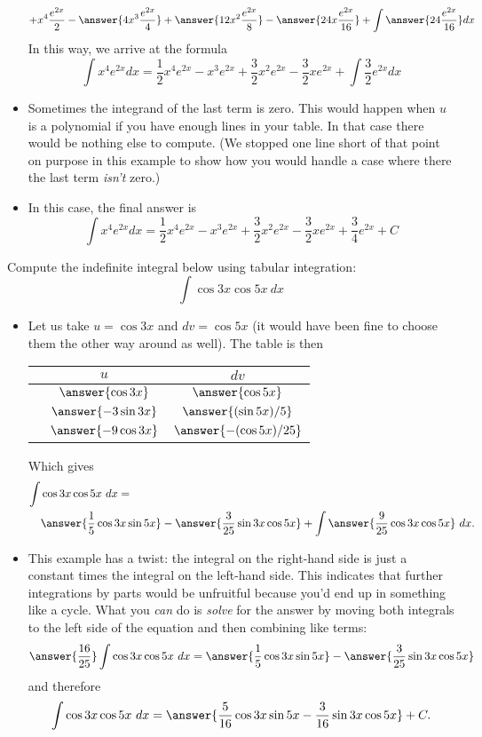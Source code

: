 \documentclass{ximera}
\begin{document}
\begin{example}
\begin{itemize}
\[ + x^4 \frac{e^{2x}}{2} - \answer{4 x^3 \frac{e^{2x}}{4}} + \answer{12 x^2 \frac{e^{2x}}{8}} - \answer{24 x\frac{e^{2x}}{16} }+ \int \answer{24 \frac{e^{2x}}{16}} dx \]
In this way, we arrive at the formula
\[ \int x^4 e^{2x} dx = \frac{1}{2} x^4 e^{2x} - x^3 e^{2x} + \frac{3}{2} x^2 e^{2x} - \frac{3}{2} x e^{2x} + \int \frac{3}{2} e^{2x} dx \]
\item Sometimes the integrand of the last term is zero. This would happen when $u$ is a polynomial if you have enough lines in your table. In that case there would be nothing else to compute.  (We stopped one line short of that point on purpose in this example to show how you would handle a case where there the last term \textit{isn't} zero.)
\item In this case, the final answer is
\[ \int x^4 e^{2x} dx = \frac{1}{2} x^4 e^{2x} - x^3 e^{2x} + \frac{3}{2} x^2 e^{2x} - \frac{3}{2} x e^{2x} + \frac{3}{4} e^{2x} +C \]
\end{itemize}
\end{example}


\begin{example}
Compute the indefinite integral below using tabular integration:
\[ \int \cos 3x \cos 5x ~dx \]
\begin{itemize}
\item Let us take $u = \cos 3x$ and $dv = \cos 5x$ (it would have been fine to choose them the other way around as well). The table is then
\begin{center}
\begin{tabular}{ccc}
& $u$ & $dv$ \\
\hline
& $\answer{\cos 3x}$ & $\answer{\cos 5x}$ \\
& $\answer{-3 \sin 3 x}$ & $\answer{(\sin 5x)/5}$ \\
& $\answer{-9 \cos 3x}$ & $\answer{-(\cos 5x)/25}$
\end{tabular}
\end{center}
Which gives
\[ \begin{aligned} \int & \cos 3x \cos 5x ~dx = \\ & \answer{ \frac{1}{5} \cos 3x \sin 5x} - \answer{\frac{3}{25} \sin 3x \cos 5x} + \int \answer{\frac{9}{25} \cos 3x \cos 5x} ~dx. \end{aligned} \]
\item This example has a twist: the integral on the right-hand side is just a constant times the integral on the left-hand side. This indicates that further integrations by parts would be unfruitful because you'd end up in something like a cycle.  What you \textit{can} do is \textit{solve} for the answer by moving both integrals to the left side of the equation and then combining like terms:
\[ \answer{\frac{16}{25}} \int  \cos 3x \cos 5x ~dx =  \answer{ \frac{1}{5} \cos 3x \sin 5x} - \answer{\frac{3}{25} \sin 3x \cos 5x} \]
and therefore
\[ \int \cos 3x \cos 5x ~ dx = \answer{  \frac{5}{16} \cos 3x \sin 5x - \frac{3}{16} \sin 3x \cos 5x} + C. \]
\end{itemize}
\end{example}
\end{document}
